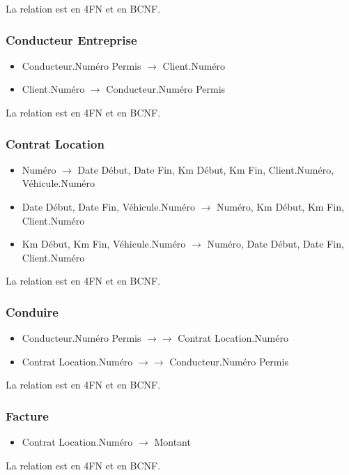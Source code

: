 \documentclass[a4paper]{article}
\newenvironment{changemargin}[2]{%
\begin{list}{}{%
\setlength{\topsep}{0pt}%
\setlength{\leftmargin}{#1}%
\setlength{\rightmargin}{#2}%
\setlength{\listparindent}{\parindent}%
\setlength{\itemindent}{\parindent}%
\setlength{\parsep}{\parskip}%
}%
\item[]}{\end{list}}
\begin{document}
\begin{changemargin}{-1cm}{-1cm}
    La relation est en 4FN et en BCNF.

    \subsubsection{Conducteur Entreprise}
    \begin{itemize}
        \item Conducteur.Numéro Permis $\rightarrow$ Client.Numéro
        \item Client.Numéro $\rightarrow$ Conducteur.Numéro Permis
    \end{itemize}

    La relation est en 4FN et en BCNF.

    \subsubsection{Contrat Location}
    \begin{itemize}
        \item Numéro $\rightarrow$ Date Début, Date Fin, Km Début, Km Fin,
        Client.Numéro, Véhicule.Numéro
        \item Date Début, Date Fin, Véhicule.Numéro $\rightarrow$ Numéro,
        Km Début, Km Fin, Client.Numéro
        \item Km Début, Km Fin, Véhicule.Numéro $\rightarrow$ Numéro,
        Date Début, Date Fin, Client.Numéro
    \end{itemize}

    La relation est en 4FN et en BCNF.

    \subsubsection{Conduire}
    \begin{itemize}
        \item Conducteur.Numéro Permis $\rightarrow\rightarrow$
        Contrat Location.Numéro
        \item Contrat Location.Numéro $\rightarrow\rightarrow$
        Conducteur.Numéro Permis
    \end{itemize}

    La relation est en 4FN et en BCNF.

    \subsubsection{Facture}
    \begin{itemize}
        \item Contrat Location.Numéro $\rightarrow$ Montant
    \end{itemize}

    La relation est en 4FN et en BCNF.

\end{changemargin}
\end{document}

